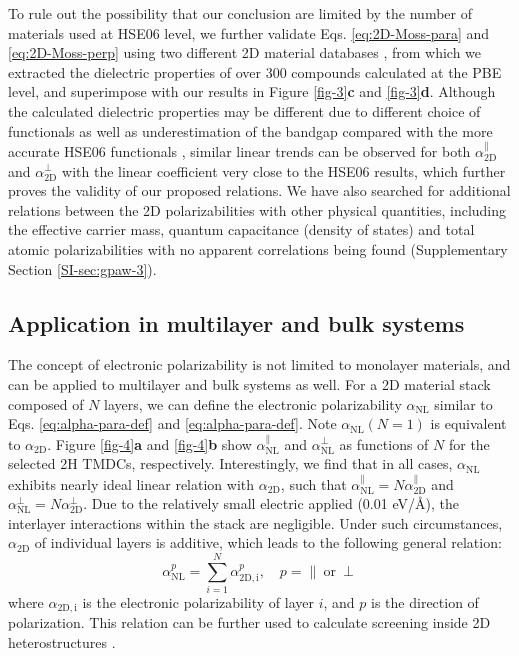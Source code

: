 To rule out the possibility that our conclusion are limited by the
number of materials used at HSE06 level, we further validate
Eqs. \ref{eq:2D-Moss-para} and \ref{eq:2D-Moss-perp} using two
different 2D material databases \cite{Haastrup_2018,Mounet_2018}, from
which we extracted the dielectric properties of over 300 compounds
calculated at the PBE level, and superimpose with our results in
Figure \ref{fig-3}{\textbf c} and \ref{fig-3}{\textbf d}. Although the
calculated dielectric properties may be different due to different
choice of functionals as well as underestimation of the bandgap
compared with the more accurate HSE06 functionals
\cite{Van_Dyck_2017}, similar linear trends can be observed for both
$\alpha^{\parallel}_{\mathrm{2D}}$ and $\alpha_{\mathrm{2D}}^{\perp}$
with the linear coefficient very close to the HSE06 results, which
further proves the validity of our proposed relations. We have also
searched for additional relations between the 2D polarizabilities with
other physical quantities, including the effective carrier mass,
quantum capacitance (density of states) and total atomic
polarizabilities with no apparent correlations being found
(Supplementary Section \ref{SI-sec:gpaw-3}).

\subsection{Application in multilayer and bulk systems}
\label{sec:apply-electr-polar}
The concept of electronic polarizability is not limited to monolayer
materials, and can be applied to multilayer and bulk systems as
well. For a 2D material stack composed of $N$ layers, we can define
the electronic polarizability $\alpha_{\mathrm{NL}}$ similar to
Eqs. \eqref{eq:alpha-para-def} and \eqref{eq:alpha-para-def}. Note
$\alpha_{\mathrm{NL}}(N=1)$ is equivalent to $\alpha_{\mathrm{2D}}$.
Figure \ref{fig-4}\textbf{a} and \ref{fig-4}\textbf{b} show
$\alpha_{\mathrm{NL}}^{\parallel}$ and $\alpha_{\mathrm{NL}}^{\perp}$
as functions of $N$ for the selected 2H TMDCs,
respectively. Interestingly, we find that in all cases,
$\alpha_{\mathrm{NL}}$ exhibits nearly ideal linear relation with
$\alpha_{\mathrm{2D}}$, such that
$\alpha_{\mathrm{NL}}^{\parallel}= N \alpha_{\mathrm{2D}}^{\parallel}$
and $\alpha_{\mathrm{NL}}^{\perp}= N
\alpha_{\mathrm{2D}}^{\perp}$. Due to the relatively small
electric applied (0.01 eV/\AA{}), the interlayer interactions within
the stack are negligible. Under such circumstances, $\alpha_{\mathrm{2D}}$ of individual layers is additive, which leads to the following general relation:
\begin{equation}
  \label{eq:alpha-nl}
  \alpha_{\mathrm{NL}}^{p} = \sum_{i=1}^{N} \alpha_{\mathrm{2D, i}}^{p},\quad p=\parallel\ \mathrm{or}\ \perp
\end{equation}
where $\alpha_{\mathrm{2D, i}}$ is the electronic polarizability of
layer $i$, and $p$ is the direction of polarization. This relation can
be further used to calculate screening inside 2D heterostructures
\cite{Kumar_2016_jpcc,Andersen_2015_dielec_vdWH}.
%
%
%

